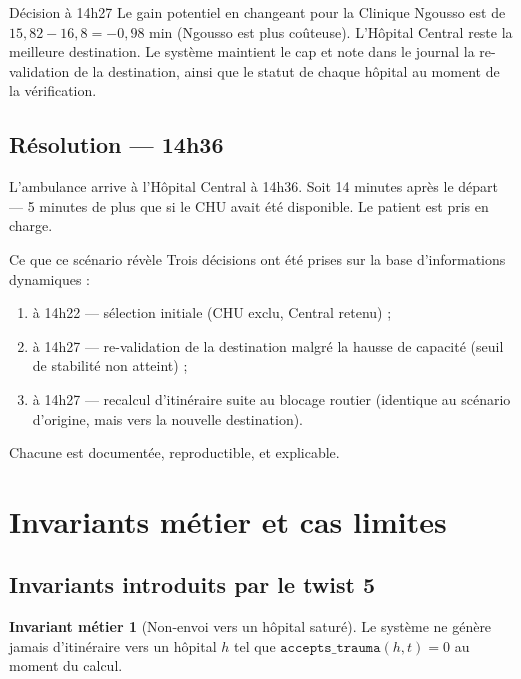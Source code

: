 \documentclass[12pt,a4paper]{article}
\theoremstyle{definition}
\newtheorem{invariant}{Invariant métier}[section]
\theoremstyle{remark}
\begin{document}
\begin{metierbox}{Décision à 14h27}
Le gain potentiel en changeant pour la Clinique Ngousso est de
$15{,}82 - 16{,}8 = -0{,}98$ min (Ngousso est plus coûteuse).
L'Hôpital Central reste la meilleure destination.
Le système maintient le cap et note dans le journal la re-validation
de la destination, ainsi que le statut de chaque hôpital au moment
de la vérification.
\end{metierbox}

\subsection{Résolution — 14h36}

L'ambulance arrive à l'Hôpital Central à 14h36. Soit 14 minutes après
le départ — 5 minutes de plus que si le CHU avait été disponible. Le
patient est pris en charge.

\begin{metierbox}{Ce que ce scénario révèle}
Trois décisions ont été prises sur la base d'informations dynamiques :
\begin{enumerate}[leftmargin=1.5em]
  \item à 14h22 — sélection initiale (CHU exclu, Central retenu) ;
  \item à 14h27 — re-validation de la destination malgré la hausse
    de capacité (seuil de stabilité non atteint) ;
  \item à 14h27 — recalcul d'itinéraire suite au blocage routier
    (identique au scénario d'origine, mais vers la nouvelle destination).
\end{enumerate}
Chacune est documentée, reproductible, et explicable.
\end{metierbox}

\newpage

\section{Invariants métier et cas limites}
\label{sec:limites}

\subsection{Invariants introduits par le twist 5}

\begin{invariant}[Non-envoi vers un hôpital saturé]
Le système ne génère jamais d'itinéraire vers un hôpital $h$ tel que
$\texttt{accepts\_trauma}(h, t) = 0$ au moment du calcul.
\end{invariant}
\end{document}
